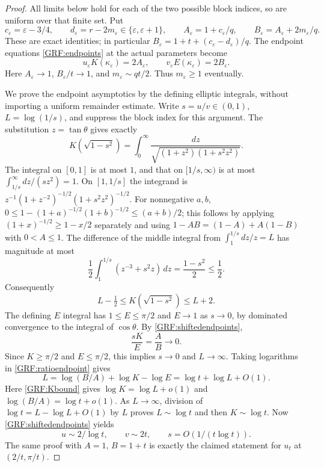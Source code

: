 \documentclass[11pt,a4paper]{article}
\begin{document}
\begin{proof}
All limits below hold for each of the two possible block indices, so are
uniform over that finite set. Put
\[
 c_\varepsilon=\varepsilon-3/4,\qquad
 d_\varepsilon=r-2m_\varepsilon\in\{\varepsilon,\varepsilon+1\},
 \qquad A_\varepsilon=1+c_\varepsilon/q,
 \qquad B_\varepsilon=A_\varepsilon+2m_\varepsilon/q.
\]
These are exact identities; in particular
$B_\varepsilon=1+t+(c_\varepsilon-d_\varepsilon)/q$.
The endpoint equations \eqref{GRF:endpoints} at the actual parameters become
\begin{equation*}\tag{GRF23}\label{GRF:shiftedendpoints}
 u_\varepsilon K(\kappa_\varepsilon)=2A_\varepsilon,
 \qquad v_\varepsilon E(\kappa_\varepsilon)=2B_\varepsilon.
\end{equation*}
Here $A_\varepsilon\to1$, $B_\varepsilon/t\to1$, and
$m_\varepsilon\sim qt/2$. Thus $m_\varepsilon\ge1$ eventually.

We prove the endpoint asymptotics by the defining elliptic integrals,
without importing a uniform remainder estimate. Write $s=u/v\in(0,1)$,
$L=\log(1/s)$, and suppress the block index for this argument.
The substitution $z=\tan\theta$ gives exactly
\[
 K(\sqrt{1-s^2})=
 \int_0^\infty\frac{dz}{\sqrt{(1+z^2)(1+s^2z^2)}}.
\]
The integral on $[0,1]$ is at most $1$, and that on $[1/s,\infty)$
is at most $\int_{1/s}^\infty dz/(sz^2)=1$.
On $[1,1/s]$ the integrand is
$z^{-1}(1+z^{-2})^{-1/2}(1+s^2z^2)^{-1/2}$.
For nonnegative $a,b$,
$0\le1-(1+a)^{-1/2}(1+b)^{-1/2}\le(a+b)/2$;
this follows by applying $(1+x)^{-1/2}\ge1-x/2$ separately and
using $1-AB=(1-A)+A(1-B)$ with $0<A\le1$.
The difference of the middle integral from $\int_1^{1/s}dz/z=L$
has magnitude at most
\[
 \frac12\int_1^{1/s}(z^{-3}+s^2z)\,d z
 =\frac{1-s^2}{2}\le\frac12.
\]
Consequently
\begin{equation*}\tag{GRF24}\label{GRF:Kbound}
 L-\tfrac12\le K(\sqrt{1-s^2})\le L+2.
\end{equation*}
The defining $E$ integral has $1\le E\le\pi/2$ and $E\to1$ as
$s\to0$, by dominated convergence to the integral of $\cos\theta$.
By \eqref{GRF:shiftedendpoints},
\begin{equation*}\tag{GRF25}\label{GRF:ratioendpoint}
 \frac{sK}{E}=\frac{A}{B}\longrightarrow0.
\end{equation*}
Since $K\ge\pi/2$ and $E\le\pi/2$, this implies $s\to0$ and $L\to\infty$.
Taking logarithms in \eqref{GRF:ratioendpoint} gives
\[
 L=\log(B/A)+\log K-\log E
   =\log t+\log L+O(1).
\]
Here \eqref{GRF:Kbound} gives $\log K=\log L+o(1)$ and
$\log(B/A)=\log t+o(1)$.
As $L\to\infty$, division of
$\log t=L-\log L+O(1)$ by $L$ proves
$L\sim\log t$ and then $K\sim\log t$.
Now \eqref{GRF:shiftedendpoints} yields
\begin{equation*}\tag{GRF26}\label{GRF:endpointasymptotic}
 u\sim2/\log t,\qquad v\sim2t,
 \qquad s=O(1/(t\log t)).
\end{equation*}
The same proof with $A=1$, $B=1+t$ is exactly the claimed statement for
$u_t$ at $(2/t,\pi/t)$.


\end{proof}
\end{document}
